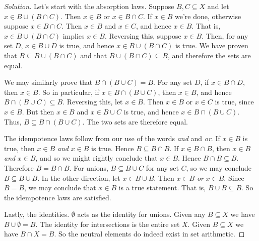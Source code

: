 \documentclass{article}
\theoremstyle{normal}
\begin{document}
    \begin{proof}[Solution]
        Let's start with the absorption laws. Suppose
        $B,C\subseteq{X}$ and let $x\in{B}\cup(B\cap{C})$. Then
        $x\in{B}$ or $x\in{B}\cap{C}$. If $x\in{B}$ we're done, otherwise
        suppose $x\in{B}\cap{C}$. Then $x\in{B}$ and $x\in{C}$, and hence
        $x\in{B}$. That is, $x\in{B}\cup(B\cap{C})$ implies $x\in{B}$.
        Reversing this, suppose $x\in{B}$. Then, for any set $D$,
        $x\in{B}\cup{D}$ is true, and hence
        $x\in{B}\cup(B\cap{C})$ is true. We have proven that
        $B\subseteq{B}\cup(B\cap{C})$ and that
        $B\cup(B\cap{C})\subseteq{B}$, and therefore the sets are equal.
        \par\hfill\par
        We may similarly prove that $B\cap(B\cup{C})=B$.
        For any set $D$, if $x\in{B}\cap{D}$, then $x\in{B}$. So in particular,
        if $x\in{B}\cap(B\cup{C})$, then $x\in{B}$, and hence
        $B\cap(B\cup{C})\subseteq{B}$. Reversing this, let $x\in{B}$.
        Then $x\in{B}$ or $x\in{C}$ is true, since $x\in{B}$. But then
        $x\in{B}$ and $x\in{B}\cup{C}$ is true, and hence
        $x\in{B}\cap(B\cup{C})$. Thus, $B\subseteq{B}\cap(B\cup{C})$. The two
        sets are therefore equal.
        \par\hfill\par
        The idempotence laws follow from our use of the words \textit{and} and
        \textit{or}. If $x\in{B}$ is true, then $x\in{B}$ \textit{and} $x\in{B}$
        is true. Hence $B\subseteq{B}\cap{B}$. If $x\in{B}\cap{B}$, then
        $x\in{B}$ \textit{and} $x\in{B}$, and so we might rightly conclude
        that $x\in{B}$. Hence $B\cap{B}\subseteq{B}$. Therefore
        $B=B\cap{B}$. For unions, $B\subseteq{B}\cup{C}$ for any set $C$,
        so we may conclude $B\subseteq{B}\cup{B}$. In the other direction,
        let $x\in{B}\cup{B}$. Then $x\in{B}$ \textit{or} $x\in{B}$. Since
        $B=B$, we may conclude that $x\in{B}$ is a true statement. That is,
        $B\cup{B}\subseteq{B}$. So the idempotence laws are satisfied.
        \par\hfill\par
        Lastly, the identities. $\emptyset$ acts as the identity for unions.
        Given any $B\subseteq{X}$ we have $B\cup\emptyset=B$. The identity for
        intersections is the entire set $X$. Given $B\subseteq{X}$ we have
        $B\cap{X}=B$. So the neutral elements do indeed exist in set arithmetic.
    \end{proof}
\end{document}
